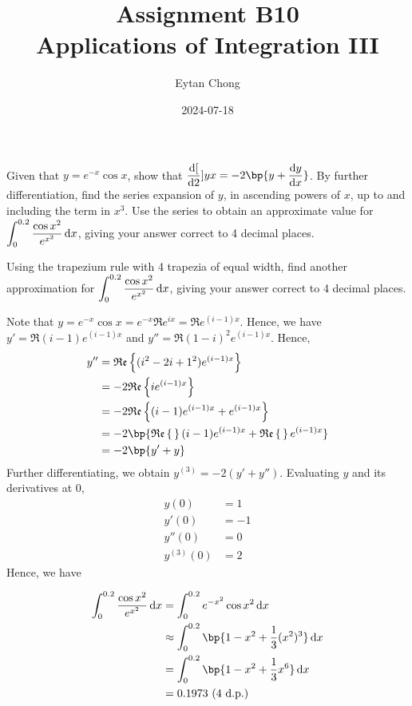 \documentclass{echw}
\title{Assignment B10\\Applications of Integration III}
\author{Eytan Chong}
\date{2024-07-18}
\begin{document}
    \problem{}
        Given that $y = e^{-x}\cos x$, show that $\der[2]{y}{x} = -2\bp{y + \der{y}{x}}$. By further differentiation, find the series expansion of $y$, in ascending powers of $x$, up to and including the term in $x^3$. Use the series to obtain an approximate value for $\displaystyle\int_0^{0.2} \dfrac{\cos x^2}{e^{x^2}} \mathop{\mathrm{d}x}$, giving your answer correct to 4 decimal places.

        Using the trapezium rule with 4 trapezia of equal width, find another approximation for $\displaystyle\int_0^{0.2}\dfrac{\cos x^2}{e^{x^2}} \mathop{\mathrm{d}x}$, giving your answer correct to 4 decimal places.

    \solution
        Note that $y = e^{-x}\cos x = e^{-x} \Re e^{ix} = \Re e^{(i-1)x}$. Hence, we have $y' = \Re{(i-1)e^{(i-1)x}}$ and $y'' = \Re{(1-i)^2e^{(i-1)x}}$. Hence,
        \begin{align*}
            y'' &= \Re{(i^2 - 2i + 1^2) e^{(i-1)x}}\\
            &= -2\Re{ie^{(i-1)x}}\\
            &= -2\Re{(i-1)e^{(i-1)x} + e^{(i-1)x}}\\
            &= -2\bp{\Re \, (i-1)e^{(i-1)x} + \Re \, e^{(i-1)x}}\\
            &= -2\bp{y' + y}
        \end{align*}
        Further differentiating, we obtain $y^{(3)} = -2(y' + y'')$. Evaluating $y$ and its derivatives at 0,
        \begin{align*}
            y(0) &= 1\\
            y'(0) &= -1\\
            y''(0) &= 0\\
            y^{(3)}(0) &= 2
        \end{align*}
        Hence, we have 

        \begin{align*}
            \int_0^{0.2} \dfrac{\cos x^2}{e^{x^2}} \d x &= \int_0^{0.2} e^{-{x^2}}\cos x^2 \d x\\
            &\approx \int_0^{0.2} \bp{1 - x^2 + \dfrac13 (x^2)^3} \d x\\
            &= \int_0^{0.2} \bp{1 - x^2 + \dfrac13 x^6} \d x\\
            &= 0.1973 \todp{4}
        \end{align*}

\end{document}
